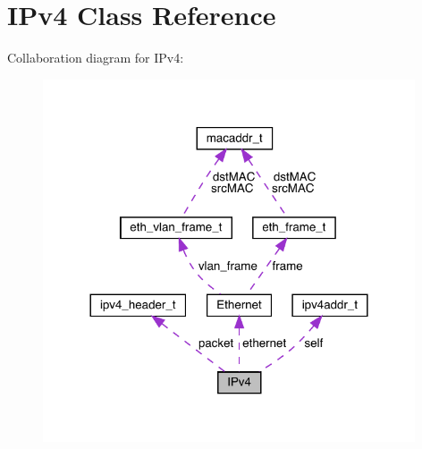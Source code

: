 \hypertarget{classIPv4}{}\section{I\+Pv4 Class Reference}
\label{classIPv4}


Collaboration diagram for I\+Pv4\+:\nopagebreak
\begin{figure}[H]
\begin{center}
\leavevmode
\includegraphics[width=312pt]{classIPv4__coll__graph}
\end{center}
\end{figure}
